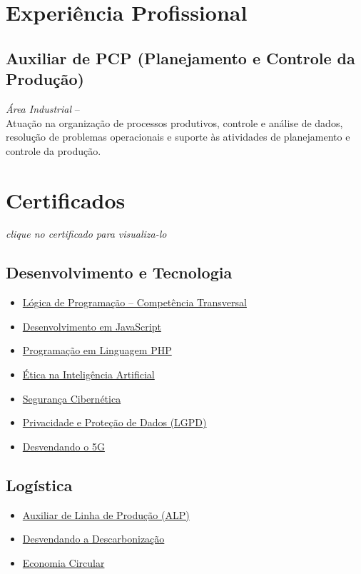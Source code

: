 \documentclass[10.5pt,a4paper]{article}
\newcommand{\itemExperiencia}[4]{%
  \subsection*{#1}
  {\small\color{corsecundaria}\textit{#2} \hfill #3}\\[0.15em]
  {\small #4}
  \vspace{0.5em}
}
\begin{document}
\begin{paracol}{2}
\section*{Experiência Profissional}
\itemExperiencia{Auxiliar de PCP (Planejamento e Controle da Produção)}
  {Área Industrial}{--}
  {Atuação na organização de processos produtivos, controle e análise de
  dados, resolução de problemas operacionais e suporte às atividades de
  planejamento e controle da produção.}

\section*{Certificados}
  {\small\itshape\color{corsecundaria}
   clique no certificado para visualiza-lo}
\subsection*{Desenvolvimento e Tecnologia}
\begin{itemize}[leftmargin=1.1em, itemsep=0.05em, label=\textcolor{corprincipal}{\small\faAngleRight}]
  \small
  \item \href{https://kaickbb.github.io/CV/files/Certificado_Compet%C3%AAnciaTransversalL%C3%B3gicaProgramacao.pdf}{Lógica de Programação -- Competência Transversal}
  \item \href{https://kaickbb.github.io/CV/files/Certificado_DesenvolvimentoJavaScrip.pdf}{Desenvolvimento em JavaScript}
  \item \href{https://kaickbb.github.io/CV/files/Certificado_Programa%C3%A7%C3%A3oEmLinguagem%20PHP.pdf}{Programação em Linguagem PHP}
  \item \href{https://kaickbb.github.io/CV/files/Certificado_EticaInteligenciaArtificia.pdf}{Ética na Inteligência Artificial}
  \item \href{https://kaickbb.github.io/CV/files/Certificado_PorDentroSeguran%C3%A7aCibern%C3%A9tic.pdf}{Segurança Cibernética}
  \item \href{https://kaickbb.github.io/CV/files/Certificado_PrivacidadeProte%C3%A7%C3%A3oDadosLGPD.pdf}{Privacidade e Proteção de Dados (LGPD)}
  \item \href{https://kaickbb.github.io/CV/files/Certificado_Desvendando5.pdf}{Desvendando o 5G}
\end{itemize}

\subsection*{Logística}
\begin{itemize}[leftmargin=1.1em, itemsep=0.05em, label=\textcolor{corprincipal}{\small\faAngleRight}]
  \small
  \item \href{https://kaickbb.github.io/CV/files/Certificado_ALP.pdf}{Auxiliar de Linha de Produção (ALP)}
  \item \href{https://kaickbb.github.io/CV/files/Certificado_DesvendandoDescarbonizacao.pdf}{Desvendando a Descarbonização}
  \item \href{https://kaickbb.github.io/CV/files/Certificado_EconomiaCircula.pdf}{Economia Circular}
\end{itemize}

\end{paracol}
\end{document}
